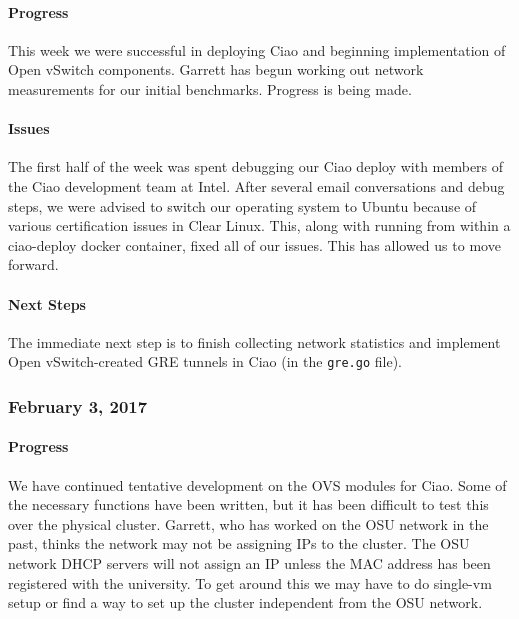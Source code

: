 \documentclass[10pt,onecolumn,journal,draftclsnofoot]{IEEEtran}
\begin{document}
\paragraph{Progress} 

This week we were successful in deploying Ciao and beginning
implementation of Open vSwitch components. Garrett has begun working out
network measurements for our initial benchmarks. Progress is being made.

\paragraph{Issues} 

The first half of the week was spent debugging our Ciao deploy with
members of the Ciao development team at Intel. After several email
conversations and debug steps, we were advised to switch our operating
system to Ubuntu because of various certification issues in Clear Linux.
This, along with running from within a ciao-deploy docker container,
fixed all of our issues. This has allowed us to move forward.

\paragraph{Next Steps} 

The immediate next step is to finish collecting network statistics and
implement Open vSwitch-created GRE tunnels in Ciao (in the
\lstinline!gre.go! file).

\subsubsection{February 3, 2017} 

\paragraph{Progress} 

We have continued tentative development on the OVS modules for Ciao.
Some of the necessary functions have been written, but it has been
difficult to test this over the physical cluster. Garrett, who has
worked on the OSU network in the past, thinks the network may not be
assigning IPs to the cluster. The OSU network DHCP servers will not
assign an IP unless the MAC address has been registered with the
university. To get around this we may have to do single-vm setup or find
a way to set up the cluster independent from the OSU network.
\end{document}
